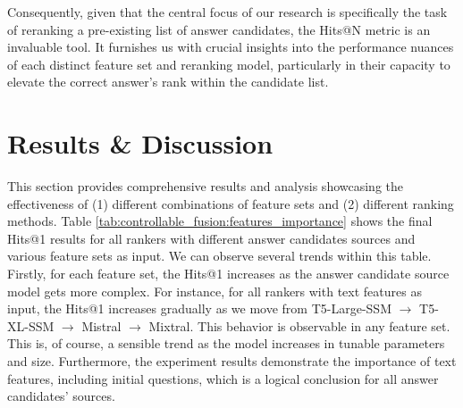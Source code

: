 Consequently, given that the central focus of our research is specifically the task of reranking a pre-existing list of answer candidates, the {Hits@N} metric is an invaluable tool. It furnishes us with crucial insights into the performance nuances of each distinct feature set and reranking model, particularly in their capacity to elevate the correct answer's rank within the candidate list.

\section{Results \& Discussion}

This section provides comprehensive results and analysis showcasing the effectiveness of (1) different combinations of feature sets and (2) different ranking methods. Table \ref{tab:controllable_fusion:features_importance} shows the final Hits@1 results for all rankers with different answer candidates sources and various feature sets as input. We can observe several trends within this table. Firstly, for each feature set, the Hits@1 increases as the answer candidate source model gets more complex. For instance, for all rankers with text features as input, the Hits@1 increases gradually as we move from T5-Large-SSM $\rightarrow$ T5-XL-SSM $\rightarrow$ Mistral  $\rightarrow$ Mixtral. This behavior is observable in any feature set. This is, of course, a sensible trend as the model increases in tunable parameters and size. Furthermore, the experiment results demonstrate the importance of text features, including initial questions, which is a logical conclusion for all answer candidates' sources. 


